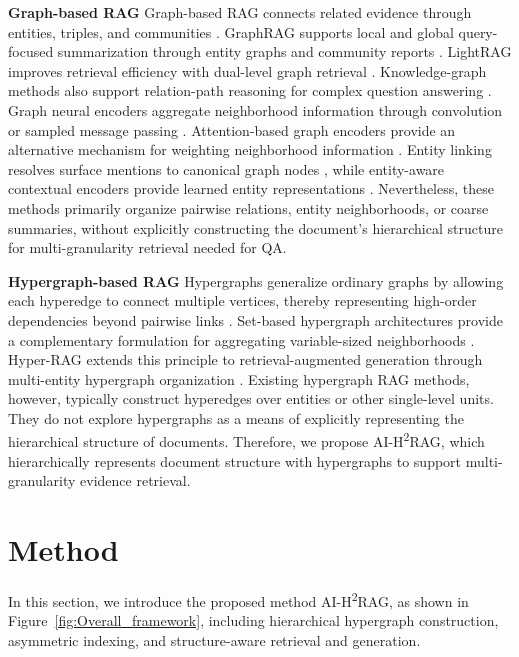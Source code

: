 \documentclass{article} %
\begin{document}
\smallskip
\noindent\textbf{Graph-based RAG}
Graph-based RAG connects related evidence through entities, triples, and communities \citep{Pan2024LLMKG,Peng2025GraphRAGSurvey}. GraphRAG supports local and global query-focused summarization through entity graphs and community reports \citep{Edge2025GraphRAG}. LightRAG improves retrieval efficiency with dual-level graph retrieval \citep{Guo2025LightRAG}. Knowledge-graph methods also support relation-path reasoning for complex question answering \citep{Lan2023ComplexKBQA,Xu2024KGRAGCSQA}. Graph neural encoders aggregate neighborhood information through convolution or sampled message passing \citep{Kipf2017GCN,Hamilton2017GraphSAGE}. Attention-based graph encoders provide an alternative mechanism for weighting neighborhood information \citep{Velickovic2018GAT,Wu2021GNNSurvey}. Entity linking resolves surface mentions to canonical graph nodes \citep{Hoffart2011AIDA,Sevgili2022EntityLinkingSurvey}, while entity-aware contextual encoders provide learned entity representations \citep{Yamada2020LUKE}. Nevertheless, these methods primarily organize pairwise relations, entity neighborhoods, or coarse summaries, without explicitly constructing the document's hierarchical structure for multi-granularity retrieval needed for QA.

\smallskip
\noindent\textbf{Hypergraph-based RAG}
Hypergraphs generalize ordinary graphs by allowing each hyperedge to connect multiple vertices, thereby representing high-order dependencies beyond pairwise links \citep{Feng2019HGNN,Gao2023HGNNPlus}. Set-based hypergraph architectures provide a complementary formulation for aggregating variable-sized neighborhoods \citep{Chien2022AllSet}. Hyper-RAG extends this principle to retrieval-augmented generation through multi-entity hypergraph organization \citep{Feng2026HyperRAG}. Existing hypergraph RAG methods, however, typically construct hyperedges over entities or other single-level units. They do not explore hypergraphs as a means of explicitly representing the hierarchical structure of documents. Therefore, we propose AI-H\textsuperscript{2}RAG, which hierarchically represents document structure with hypergraphs to support multi-granularity evidence retrieval.

\section{Method}\label{sec:method}

In this section, we introduce the proposed method AI-H\textsuperscript{2}RAG, as shown in Figure~\ref{fig:Overall_framework}, including hierarchical hypergraph construction, asymmetric indexing, and structure-aware retrieval and generation. 
\end{document}
